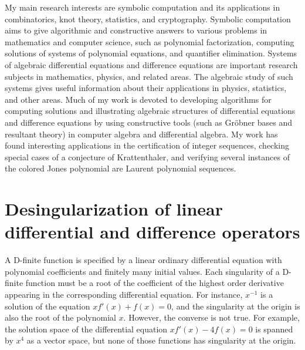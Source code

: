 \documentclass[10pt,a4paper]{article}
\begin{document}
My main research interests are symbolic computation and its applications in combinatorics, knot theory, statistics, 
and cryptography.  Symbolic computation aims to give algorithmic and constructive answers 
to various problems in mathematics and computer science, such as polynomial factorization, computing solutions of systems of polynomial equations, 
and quantifier elimination. Systems of algebraic differential equations and difference equations are important research subjects in mathematics, physics, and related areas. 
The algebraic study of such systems gives useful information about their applications in physics, statistics, and other areas. 
Much of my work is devoted to developing algorithms for  computing solutions and illustrating algebraic structures of differential equations and difference equations
by using constructive tools (such as Gr\"obner bases and resultant theory) in computer algebra and differential algebra. 
My work has found interesting applications in the certification of integer sequences, checking special cases of a conjecture of Krattenthaler, and verifying 
several instances of the colored Jones polynomial are Laurent polynomial sequences.  

\nopagebreak 
\section*{Desingularization of linear differential and difference operators}

A D-finite function is specified by a linear ordinary differential equation with polynomial 
coefficients and finitely many initial values. Each singularity of a D-finite function 
must be a root of the coefficient of the highest order derivative appearing 
in the corresponding differential equation. 
For instance, $x^{-1}$ is a solution of the equation $x f'(x) + f(x) = 0$, 
and the singularity at the origin is also the root of the polynomial $x$. 
However, the converse is not true. For example, the solution space of 
the differential equation $x f'(x) - 4 f(x) = 0$ is spanned by $x^4$ as a vector space, 
but none of those functions has singularity at the origin. 
\end{document}
